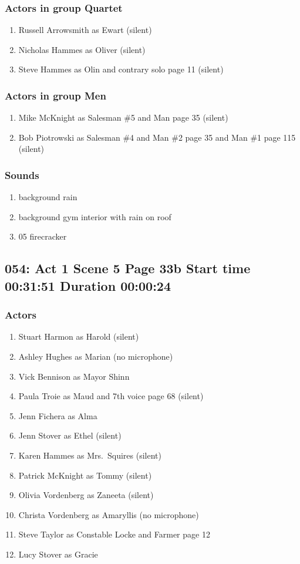 \subsubsection{Actors in group Quartet}
\begin{enumerate}
\item Russell Arrowsmith as Ewart (silent)
\item Nicholas Hammes as Oliver (silent)
\item Steve Hammes as Olin and contrary solo page 11 (silent)
\end{enumerate}
\subsubsection{Actors in group Men}
\begin{enumerate}
\item Mike McKnight as Salesman \#5 and Man page 35 (silent)
\item Bob Piotrowski as Salesman \#4 and Man \#2 page 35 and Man \#1 page 115 (silent)
\end{enumerate}

\subsubsection{Sounds}
\begin{enumerate}
\item background rain
\item background gym interior with rain on roof
\item 05 firecracker
\end{enumerate}
\subsection{054: Act 1 Scene 5 Page 33b Start time 00:31:51 Duration 00:00:24}

\subsubsection{Actors}
\begin{enumerate}
\item Stuart Harmon as Harold (silent)
\item Ashley Hughes as Marian (no microphone)
\item Vick Bennison as Mayor Shinn
\item Paula Troie as Maud and 7th voice page 68 (silent)
\item Jenn Fichera as Alma
\item Jenn Stover as Ethel (silent)
\item Karen Hammes as Mrs.~Squires (silent)
\item Patrick McKnight as Tommy (silent)
\item Olivia Vordenberg as Zaneeta (silent)
\item Christa Vordenberg as Amaryllis (no microphone)
\item Steve Taylor as Constable Locke and Farmer page 12
\item Lucy Stover as Gracie
\end{enumerate}
